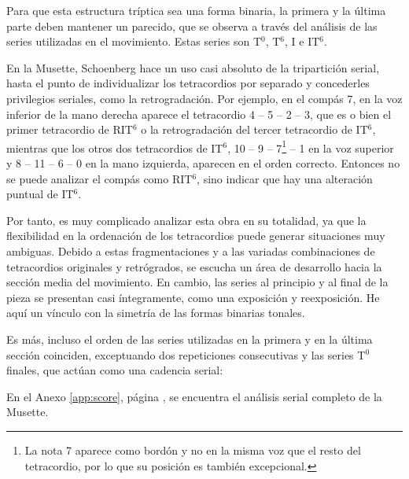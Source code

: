 		Para que esta estructura tríptica sea una forma binaria, la primera y la última parte deben mantener un parecido, que se observa a través del análisis de las series utilizadas en el movimiento. Estas series son T$^0$, T$^6$, I e IT$^6$.
		
		En la Musette, Schoenberg hace un uso casi absoluto de la tripartición serial, hasta el punto de individualizar los tetracordios por separado y concederles privilegios seriales, como la retrogradación. Por ejemplo, en el compás 7, en la voz inferior de la mano derecha aparece el tetracordio 4 -- 5 -- 2 -- 3, que es o bien el primer tetracordio de RIT$^6$ o la retrogradación del tercer tetracordio de IT$^6$, mientras que los otros dos tetracordios de IT$^6$, 10 -- 9 -- 7\footnote{La nota 7 aparece como bordón y no en la misma voz que el resto del tetracordio, por lo que su posición es también excepcional.} -- 1 en la voz superior y 8 -- 11 -- 6 -- 0 en la mano izquierda, aparecen en el orden correcto. Entonces no se puede analizar el compás como RIT$^6$, sino indicar que hay una alteración puntual de IT$^6$.
		
		Por tanto, es muy complicado analizar esta obra en su totalidad, ya que la flexibilidad en la ordenación de los tetracordios puede generar situaciones muy ambiguas. Debido a estas fragmentaciones y a las variadas combinaciones de tetracordios originales y retrógrados, se escucha un área de desarrollo hacia la sección media del movimiento. En cambio, las series al principio y al final de la pieza se presentan casi íntegramente, como una exposición y reexposición. He aquí un vínculo con la simetría de las formas binarias tonales. \cite{clercq}
		
		Es más, incluso el orden de las series utilizadas en la primera y en la última sección coinciden, exceptuando dos repeticiones consecutivas y las series T$^0$ finales, que actúan como una cadencia serial:
		
		
		En el Anexo \ref{app:score}, página \pageref{app:score}, se encuentra el análisis serial completo de la Musette.